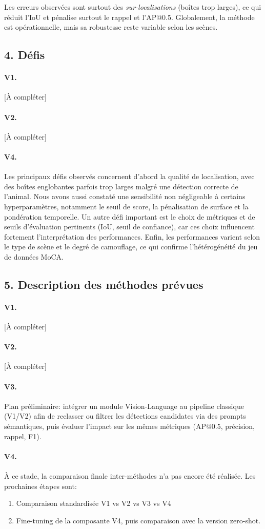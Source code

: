 \documentclass{article}
\begin{document}
Les erreurs observées sont surtout des \textit{sur-localisations} (boîtes trop larges), ce qui réduit l’IoU et pénalise surtout le rappel et l’AP@0.5. Globalement, la méthode est opérationnelle, mais sa robustesse reste variable selon les scènes.

\subsection{4. Défis}
\paragraph{V1.} [À compléter]

\paragraph{V2.} [À compléter]

\paragraph{V4.}
Les principaux défis observés concernent d’abord la qualité de localisation, avec des boîtes englobantes parfois trop larges malgré une détection correcte de l’animal. Nous avons aussi constaté une sensibilité non négligeable à certains hyperparamètres, notamment le seuil de score, la pénalisation de surface et la pondération temporelle. Un autre défi important est le choix de métriques et de seuils d’évaluation pertinents (IoU, seuil de confiance), car ces choix influencent fortement l’interprétation des performances. Enfin, les performances varient selon le type de scène et le degré de camouflage, ce qui confirme l’hétérogénéité du jeu de données MoCA.

\subsection{5. Description des méthodes prévues}
\paragraph{V1.} [À compléter]

\paragraph{V2.} [À compléter]

\paragraph{V3.}
Plan préliminaire: intégrer un module Vision-Language au pipeline classique (V1/V2) afin de reclasser ou filtrer les détections candidates via des prompts sémantiques, puis évaluer l’impact sur les mêmes métriques (AP@0.5, précision, rappel, F1).

\paragraph{V4.}
À ce stade, la comparaison finale inter-méthodes n’a pas encore été réalisée. Les prochaines étapes sont:
\begin{enumerate}
  \item Comparaison standardisée V1 vs V2 vs V3 vs V4
  \item Fine-tuning de la composante V4, puis comparaison avec la version zero-shot.
\end{enumerate}
\end{document}
